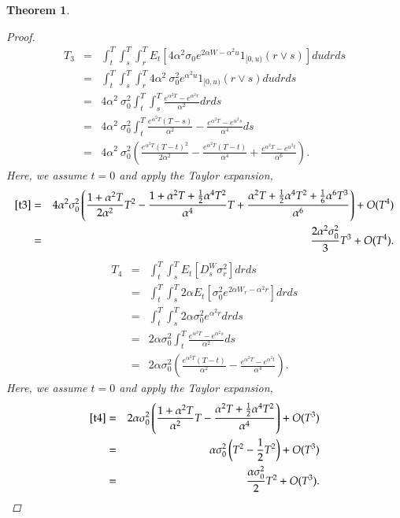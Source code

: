 \documentclass[11pt]{article}
\newtheorem{theorem}{Theorem}
\begin{document}
\begin{theorem}
\begin{proof}
\begin{eqnarray}
T_3 
&=& \int_{t}^{T} \int_{s}^{T}\int_{r}^{T} E_{t}\left[ 4 \alpha^2\sigma_0 e^{2\alpha W - \alpha^2 u}1_{[0,u)}(r \vee s)\right]du dr ds\nonumber\\
&=& \int_{t}^{T} \int_{s}^{T}\int_{r}^{T} 4 \alpha^2\ \sigma_0^2 e^{\alpha^2 u}1_{[0,u)}(r \vee s)du dr ds\nonumber\\
&=& 4 \alpha^2\ \sigma_0^2 \int_{t}^{T} \int_{s}^{T} \frac{e^{\alpha^2 T} - e^{\alpha^2 r}}{\alpha^2} dr ds\nonumber\\
&=& 4 \alpha^2\ \sigma_0^2 \int_{t}^{T} \frac{e^{\alpha^2 T}(T-s)}{\alpha^2} - \frac{e^{\alpha^2 T} - e^{\alpha^2 s}}{\alpha^4} ds\nonumber\\
&=& 4 \alpha^2\ \sigma_0^2 \left( \frac{e^{\alpha^2 T}(T-t)^2}{2\alpha^2} - \frac{e^{\alpha^2 T}(T-t)}{\alpha^4} + \frac{e^{\alpha^2 T} - e^{\alpha^2 t}}{\alpha^6} \right).\label{t3}
\end{eqnarray}
Here, we assume $t=0$ and apply the Taylor expansion,
\begin{eqnarray}
\eqref{t3}
&=& 
4\alpha^2 \sigma_0^2  \left(\frac{1+\alpha^2T}{2\alpha^2}T^2 - \frac{1+\alpha^2T + \frac{1}{2}\alpha^4T^2}{\alpha^4}T + \frac{\alpha^2T + \frac{1}{2}\alpha^4T^2 + \frac{1}{6}\alpha^6T^3}{\alpha^6}\right)+O(T^4)\nonumber\\
&=& 
\frac{2 \alpha^2\sigma_0^2}{3}T^3+O(T^4).
\end{eqnarray}
\begin{eqnarray}
T_4
&=& 
\int_{t}^{T}\int_{s}^{T}E_{t}\left[D_{s}^{W}\sigma _{r}^{2}\right] dr ds \nonumber\\
&=&
\int_{t}^{T}\int_{s}^{T}2\alpha E_{t}\left[ \sigma_0^2 e^{2\alpha W_r - \alpha^2 r}\right] dr ds \nonumber\\
&=&
\int_{t}^{T}\int_{s}^{T}2\alpha \sigma_0^2 e^{\alpha^2 r} dr ds \nonumber\\
&=&
2\alpha \sigma_0^2 \int_{t}^{T} \frac{e^{\alpha^2 T} - e^{\alpha^2 s}}{\alpha^2} ds \nonumber\\
&=&
2\alpha \sigma_0^2  \left(\frac{e^{\alpha^2 T}(T-t)}{\alpha^2} - \frac{e^{\alpha^2 T} - e^{\alpha^2 t}}{\alpha^4} \right).\label{t4}
\end{eqnarray}
Here, we assume $t=0$ and apply the Taylor expansion,
\begin{eqnarray}
\eqref{t4}
&=& 
2\alpha \sigma_0^2  \left(\frac{1+\alpha^2 T}{\alpha^2}T - \frac{\alpha^2T + \frac{1}{2}\alpha^4 T^2}{\alpha^4}\right) + O(T^3)\nonumber\\
&=& 
\alpha \sigma_0^2  \left(T^2 - \frac{1}{2}T^2\right) + O(T^3)\nonumber\\
&=& 
\frac{\alpha \sigma_0^2}{2}T^2+O(T^3).
\end{eqnarray}


\end{proof}
\end{theorem}
\end{document}
